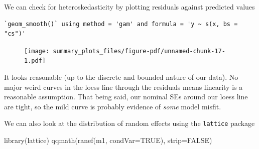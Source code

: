 \documentclass[
  letterpaper,
  DIV=11,
  numbers=noendperiod]{scrreprt}
\newenvironment{Shaded}{\begin{snugshade}}{\end{snugshade}}
\newcommand{\AttributeTok}[1]{\textcolor[rgb]{0.49,0.56,0.16}{#1}}
\newcommand{\ConstantTok}[1]{\textcolor[rgb]{0.53,0.00,0.00}{#1}}
\newcommand{\FloatTok}[1]{\textcolor[rgb]{0.25,0.63,0.44}{#1}}
\newcommand{\FunctionTok}[1]{\textcolor[rgb]{0.02,0.16,0.49}{#1}}
\newcommand{\NormalTok}[1]{\textcolor[rgb]{0.00,0.44,0.13}{#1}}
\newcommand{\OtherTok}[1]{\textcolor[rgb]{0.00,0.44,0.13}{#1}}
\newcommand{\SpecialCharTok}[1]{\textcolor[rgb]{0.25,0.44,0.63}{#1}}
\newcommand{\StringTok}[1]{\textcolor[rgb]{0.25,0.44,0.63}{#1}}
\begin{document}
We can check for heteroskedasticity by plotting residuals against
predicted values

\begin{Shaded}
\end{Shaded}

\begin{verbatim}
`geom_smooth()` using method = 'gam' and formula = 'y ~ s(x, bs = "cs")'
\end{verbatim}

\begin{figure}[H]

{\centering \texttt{[image: summary\_plots\_files/figure-pdf/unnamed-chunk-17-1.pdf]}

}

\end{figure}

It looks reasonable (up to the discrete and bounded nature of our data).
No major weird curves in the loess line through the residuals means
linearity is a reasonable assumption. That being said, our nominal SEs
around our loess line are tight, so the mild curve is probably evidence
of \emph{some} model misfit.

We can also look at the distribution of random effects using the
\texttt{lattice} package

\begin{Shaded}
\begin{Highlighting}[]
  \FunctionTok{library}\NormalTok{(lattice)}
  \FunctionTok{qqmath}\NormalTok{(}\FunctionTok{ranef}\NormalTok{(m1, }\AttributeTok{condVar=}\ConstantTok{TRUE}\NormalTok{), }\AttributeTok{strip=}\ConstantTok{FALSE}\NormalTok{)}
\end{Highlighting}
\end{Shaded}
\end{document}
